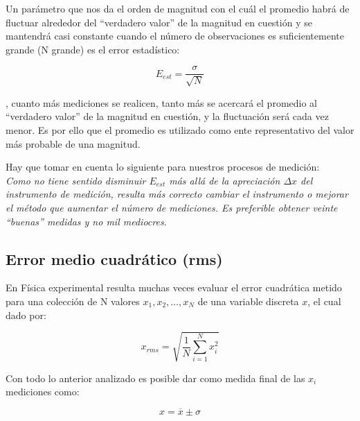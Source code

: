 Un parámetro que nos  da  el  orden  de  magnitud  con  el  cuál  el  promedio  habrá  de  fluctuar  alrededor  del 
``verdadero  valor''  de  la  magnitud  en  cuestión  y  se  mantendrá  casi  constante  cuando  el  número  de observaciones es 
suficientemente grande (N grande) es el error estadístico:

\begin{equation}
 E_{est}=\frac{\sigma}{\sqrt{N}}
\end{equation}

, cuanto más mediciones se realicen, tanto más se acercará el promedio al ``verdadero valor'' de la magnitud en cuestión, y la 
fluctuación será cada vez menor.  Es  por  ello  que  el  promedio  es  utilizado  como  ente  representativo  del  valor  más  
probable  de  una magnitud.  

Hay que tomar en cuenta lo siguiente para nuestros procesos de medición:\\

\textit{Como no tiene sentido disminuir $E_{est}$ más allá de la apreciación $\Delta x$ del instrumento de medición, resulta más  
correcto cambiar el instrumento o mejorar el método que aumentar el número de mediciones. Es preferible obtener veinte ``buenas'' 
medidas y no mil mediocres.}\\

\subsection{Error medio cuadrático (rms)}

En Física experimental resulta muchas veces evaluar el error cuadrática metido para una colección de N valores 
{$x_1, x_2, \ldots , x_N$} de una variable discreta $x$, el cual dado por:


\begin{equation}
 x_{rms} =\sqrt{  \frac{1}{N}\sum_{i = 1}^N x_{i}^2 }
\end{equation}

\vspace{1.5cm}

Con todo lo anterior analizado es posible dar como medida final de las $x_i$ mediciones como:

\begin{equation}
 x =  \overline{x} \pm \sigma
\end{equation}









 
 
